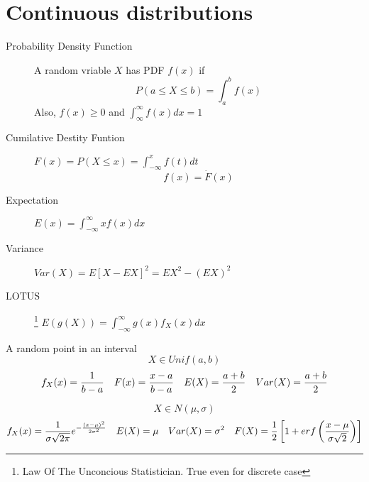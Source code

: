 \section{Continuous distributions}

\begin{slide}
\begin{description}
\item[Probability Density Function]
A random vriable $X$ has PDF $f(x)$ if $$P(a\leq X \leq b) = \int_a^bf(x)$$ Also, $f(x)\geq 0$ and $\int_{\infty}^\infty f(x)dx = 1$ 
\item[Cumilative Destity Funtion]
$F(x) = P(X\leq x) = \int_{-\infty}^xf(t)dt$
$$f(x) = \dot{F}(x)$$
\item[Expectation] $E(x) = \int_{-\infty}^\infty xf(x)dx$
\item[Variance] $Var(X) = E[X - EX]^2 = EX^2 - (EX)^2$
\item[LOTUS]\footnote[3]{Law Of The Unconcious Statistician. True even for discrete case} $E(g(X)) = \int_{-\infty}^\infty g(x)f_X(x)dx$
\end{description}

\end{slide}





\begin{slide}
\begin{shaded}
{\noindent
    A random point in an interval
}
    $$X \in Unif(a,b)$$
    $$
    f_X(x) = {1\over b-a}  
    \quad 
    F(x) = {x-a \over b-a}
    \quad
    E(X)= {a+b \over 2} 
    \quad
    Var(X)= {a+b \over 2} 
    $$
\end{shaded}


\end{slide}

\begin{slide} 
\begin{shaded}
    $$X \in N(\mu,\sigma)$$
    $$
    f_X(x) = {1\over \sigma \sqrt{2\pi}} e^{-{(x-\mu)^2 \over 2\sigma^2}} 
    \quad
    E(X)= \mu
    \quad
    Var(X)=\sigma^2
    \quad 
    F(X) = {1\over 2}\left[1+erf\left({x-\mu \over \sigma\sqrt{2}}\right)\right]
    $$
\end{shaded}
\end{slide}

\begin{slide} [Dirichlet]
\end{slide}
\begin{slide} [Beta]
\end{slide}


